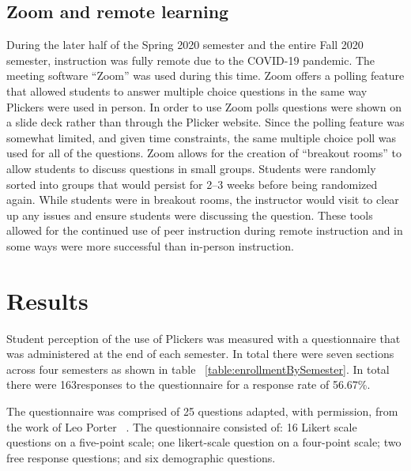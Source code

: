 \documentclass[12pt]{article}
\newcommand\sampleSize{163}
\begin{document}
\subsection{Zoom and remote learning}
During the later half of the Spring 2020 semester and the entire Fall 2020 semester, instruction was fully remote due to the COVID-19 pandemic. The meeting software ``Zoom''  was used during this time. Zoom offers a polling feature that allowed students to answer multiple choice questions in the same way Plickers were used in person. In order to use Zoom polls questions were shown on a slide deck rather than through the Plicker website. Since the polling feature was somewhat limited, and given time constraints, the same multiple choice poll was used for all of the questions. 
Zoom allows for the creation of ``breakout rooms'' to allow students to discuss questions in small groups. Students were randomly sorted into groups that would persist for 2–3 weeks before being randomized again. While students were in breakout rooms, the instructor would visit to clear up any issues and ensure students were discussing the question. These tools allowed for the continued use of peer instruction during remote instruction and in some ways were more successful than in-person instruction.

\section{Results}

Student perception of the use of Plickers was measured with a questionnaire that was administered at the end of each semester. In total there were seven sections across four semesters as shown in table ~\ref{table:enrollmentBySemester}. In total there were \sampleSize responses to the questionnaire for a response rate of 56.67\%.

The questionnaire was comprised of 25 questions adapted, with permission, from the work of Leo Porter ~\cite{porterPeerInstructionStudents2011}. The questionnaire consisted of: 16 Likert scale questions on a five-point scale; one likert-scale question on a four-point scale;  two free response questions; and six demographic questions. 
\end{document}
